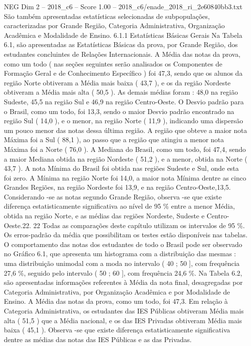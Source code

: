 \begin{textsample}{NEG Dim 2 – 2018\_c6 – Score 1.00 – 2018\_c6/enade\_2018\_ri\_2e60840bb3.txt}
São também apresentadas estatísticas selecionadas de subpopulações, caracterizadas por Grande Região, Categoria Administrativa, Organização Acadêmica e Modalidade de Ensino. 6.1.1 Estatísticas Básicas Gerais Na Tabela 6.1, são apresentadas as Estatísticas Básicas da prova, por Grande Região, dos estudantes concluintes de Relações Internacionais.
A Média das notas da prova, como um todo ( nas seções seguintes serão analisados os Componentes de Formação Geral e de Conhecimento Específico ) foi 47,3, sendo que os alunos da região Norte obtiveram a Média mais baixa ( 43,7 ), e os da região Nordeste obtiveram a Média mais alta ( 50,5 ).
As demais médias foram : 48,0 na região Sudeste, 45,5 na região Sul e 46,9 na região Centro-Oeste.
O Desvio padrão para o Brasil, como um todo, foi 13,3, sendo o maior Desvio padrão encontrado na região Sul ( 14,0 ), e o menor, na região Norte ( 11,9 ), indicando uma dispersão um pouco menor das notas dessa última região.
A região que obteve a maior nota Máxima foi a Sul ( 88,1 ), ao passo que a região que atingiu a menor nota Máxima foi a Norte ( 76,0 ).
A Mediana do Brasil, como um todo, foi 47,4, sendo a maior Mediana obtida na região Nordeste ( 51,2 ), e a menor, obtida na Norte ( 43,7 ).
A nota Mínima do Brasil foi obtida nas regiões Sudeste e Sul, onde esta foi zero.
A Mínima na região Norte foi 14,0, a maior nota Mínima dentre as cinco Grandes Regiões, na região Nordeste foi 13,9, e na região Centro-Oeste,13,5.
Considerando -se as notas segundo Grande Região, observa -se que existe diferença estatisticamente significativa ao nível de 95 \% entre a menor Média, obtida na região Norte, e as médias das regiões Nordeste, Sudeste e Centro-Oeste.22. 22 Todas as comparações deste capítulo utilizam os intervalos de 95 \%.
Os erros-padrão da média que possibilitam os testes estão disponíveis nas tabelas.
O comportamento das notas dos estudantes de todo o Brasil pode ser observado no Gráfico 6.1, que apresenta um histograma com a distribuição das mesmas : uma distribuição unimodal com a moda no intervalo ( 40 ; 50 ], com frequência 27,6 \%, seguido pelo intervalo ( 50 ; 60 ], com frequência 24,6 \%.
Na Tabela 6.2, são apresentadas informações referentes à Média da nota final, desagregadas por Categoria Administrativa, por Organização Acadêmica e por Modalidade de Ensino.
A Média das notas da prova, como um todo, foi 47,3.
Em relação à Categoria Administrativa, os estudantes das IES Públicas obtiveram Média mais alta ( 51,5 ) que a Média nacional, e os das IES Privadas obtiveram Média mais baixa ( 45,1 ).
Observa -se que existe diferença estatisticamente significativa dentre as médias das notas das IES Públicas e as das Privadas.

\end{textsample}
